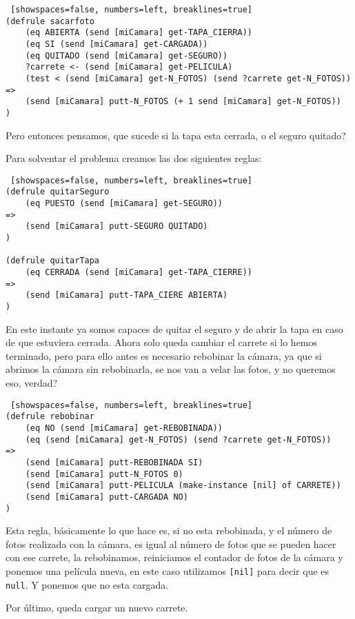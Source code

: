 \documentclass[hidelinks]{scrreprt}
\begin{document}
\begin{lstlisting} [showspaces=false, numbers=left, breaklines=true]
(defrule sacarfoto
    (eq ABIERTA (send [miCamara] get-TAPA_CIERRA))
    (eq SI (send [miCamara] get-CARGADA))
    (eq QUITADO (send [miCamara] get-SEGURO))
    ?carrete <- (send [miCamara] get-PELICULA)
    (test < (send [miCamara] get-N_FOTOS) (send ?carrete get-N_FOTOS))
=>
    (send [miCamara] putt-N_FOTOS (+ 1 send [miCamara] get-N_FOTOS))
)
\end{lstlisting}

Pero entonces pensamos, \textquestiondown que sucede si la tapa esta cerrada, o el seguro quitado?

Para solventar el problema creamos las dos siguientes reglas:
\begin{lstlisting} [showspaces=false, numbers=left, breaklines=true]
(defrule quitarSeguro
    (eq PUESTO (send [miCamara] get-SEGURO))
=>
    (send [miCamara] putt-SEGURO QUITADO)
)

(defrule quitarTapa
    (eq CERRADA (send [miCamara] get-TAPA_CIERRE))
=>
    (send [miCamara] putt-TAPA_CIERE ABIERTA)
)
\end{lstlisting}

En este instante ya somos capaces de quitar el seguro y de abrir la tapa en caso de que estuviera cerrada.
Ahora solo queda cambiar el carrete si lo hemos terminado, pero para ello antes es necesario rebobinar la
c\'{a}mara, ya que si abrimos la c\'{a}mara sin rebobinarla, se nos van a velar las fotos, y no queremos eso,
\textquestiondown verdad?


\begin{lstlisting} [showspaces=false, numbers=left, breaklines=true]
(defrule rebobinar
    (eq NO (send [miCamara] get-REBOBINADA))
    (eq (send [miCamara] get-N_FOTOS) (send ?carrete get-N_FOTOS))
=>
    (send [miCamara] putt-REBOBINADA SI)
    (send [miCamara] putt-N_FOTOS 0)
    (send [miCamara] putt-PELICULA (make-instance [nil] of CARRETE))
    (send [miCamara] putt-CARGADA NO)
)
\end{lstlisting}

Esta regla, b\'{a}sicamente lo que hace es, si no esta rebobinada, y el n\'{u}mero de fotos realizada con la
c\'{a}mara, es igual al n\'{u}mero de fotos que se pueden hacer con ese carrete, la rebobinamos, reiniciamos el
contador de fotos de la c\'{a}mara y ponemos una pel\'{i}cula nueva, en este caso utilizamos 
\texttt{[nil]} para decir que es \texttt{null}. Y ponemos que no esta cargada.

Por \'{u}ltimo, queda cargar un nuevo carrete.
\end{document}
